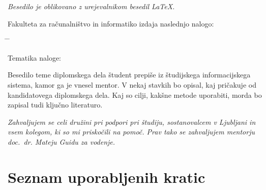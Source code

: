 \documentclass[a4paper, 12pt]{book}
\newcommand{\clearemptydoublepage}{\newpage{\pagestyle{empty}\cleardoublepage}}
\begin{document}
\begin{center}
\mbox{}\vfill
\emph{Besedilo je oblikovano z urejevalnikom besedil \LaTeX.}
\end{center}
\clearemptydoublepage

\thispagestyle{empty}
\vspace*{4cm}

\noindent
Fakulteta za računalništvo in informatiko izdaja naslednjo nalogo:
\medskip
\begin{tabbing}
\hspace{32mm}\= \hspace{6cm} \= \kill




Tematika naloge:
\end{tabbing}
Besedilo teme diplomskega dela študent prepiše iz študijskega informacijskega sistema, kamor ga je vnesel mentor. V nekaj stavkih bo opisal, kaj pričakuje od kandidatovega diplomskega dela. Kaj so cilji, kakšne metode uporabiti, morda bo zapisal tudi ključno literaturo.
\vspace{15mm}






\vspace{2cm}

\clearemptydoublepage

\thispagestyle{empty}\mbox{}\vfill\null\it%
\noindent
Zahvaljujem se celi družini pri podpori pri študiju, sostanovalcem v Ljubljani in vsem kolegom, ki so mi priskočili na pomoč.
Prav tako se zahvaljujem mentorju doc.\ dr.  Mateju Guidu za vodenje.

\rm\normalfont

\clearemptydoublepage


\pagestyle{empty}
\def\thepage{}%
\tableofcontents{}


\clearemptydoublepage


\chapter*{Seznam uporabljenih kratic}  %
\end{document}
